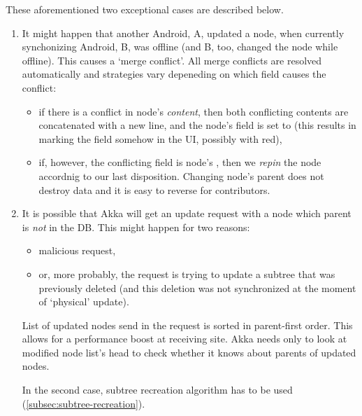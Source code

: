 These aforementioned two exceptional cases are described below.

\begin{enumerate}
	\item \label{akka-conflict} It might happen that another Android, A, updated a node, when currently synchonizing Android, B, was offline (and B, too, changed the node while offline). This causes a `merge conflict'. All merge conflicts are resolved automatically and strategies vary depeneding on which field causes the conflict:
	\begin{itemize}
		\item if there is a conflict in node's \emph{content}, then both conflicting contents are concatenated with a new line,  and the node's  field is set to  (this results in marking the field somehow in the UI, possibly with red),
		\item if, however, the conflicting field is node's , then we \emph{repin} the node accordnig to our last disposition. Changing node's parent does not destroy data and it is easy to reverse for contributors.
	\end{itemize}

	\item \label{akka-unknown-parent} It is possible that Akka will get an update request with a node which parent is \emph{not} in the DB. This might happen for two reasons:
	\begin{itemize}
		\item malicious request,
		\item or, more probably, the request is trying to update a subtree that was previously deleted (and this deletion was not synchronized at the moment of `physical' update).
	\end{itemize}

	List of updated nodes send in the request is sorted in parent-first order. This allows for a performance boost at receiving site. Akka needs only to look at modified node list's head to check whether it knows about parents of updated nodes.

	In the second case, subtree recreation algorithm has to be used (\cref{subsec:subtree-recreation}).
\end{enumerate}

